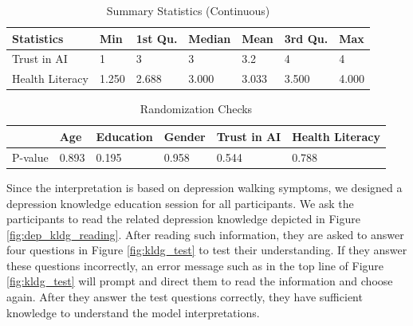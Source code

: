 \documentclass[mnsc]{informs3b} %
\begin{document}
\begin{table}[h]
\centering
\caption{Summary Statistics (Continuous)}
\label{tb:summary_stats_con}
\small
\begin{threeparttable}
\begin{tabular}{L{70pt}C{40pt}C{40pt}C{40pt}C{40pt}C{40pt}C{40pt}}
\toprule
 Statistics & Min & 1st Qu. & Median & Mean & 3rd Qu. & Max \\ \midrule
 Trust in AI & 1 & 3 & 3 & 3.2 & 4 & 4  \\
 Health Literacy & 1.250 & 2.688 & 3.000 & 3.033 & 3.500 & 4.000 \\
 \bottomrule
\end{tabular}
\end{threeparttable}
\end{table}


\begin{table}[h]
\centering
\caption{Randomization Checks}
\label{tb:randomization_check}
\small
\begin{threeparttable}
\begin{tabular}{L{40pt}C{40pt}C{40pt}C{40pt}C{70pt}C{70pt}}
\toprule
  & Age & Education & Gender & Trust in AI & Health Literacy \\ \midrule
 P-value & 0.893 & 0.195 & 0.958 & 0.544 & 0.788 \\
 \bottomrule
\end{tabular}
\end{threeparttable}
\end{table}


Since the interpretation is based on depression walking symptoms, we designed a depression knowledge education session for all participants. We ask the participants to read the related depression knowledge depicted in Figure \ref{fig:dep_kldg_reading}. After reading such information, they are asked to answer four questions in Figure \ref{fig:kldg_test} to test their understanding. If they answer these questions incorrectly, an error message such as in the top line of Figure \ref{fig:kldg_test} will prompt and direct them to read the information and choose again. After they answer the test questions correctly, they have sufficient knowledge to understand the model interpretations.
\end{document}
